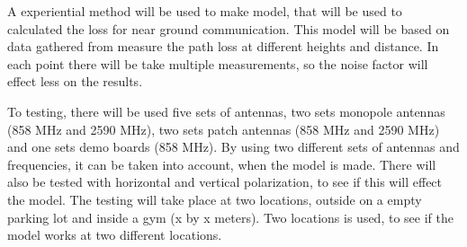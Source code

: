 A experiential method will be used to make model, that will be used to calculated the loss for near ground communication. This model will be based on data gathered from measure the path loss at different heights and distance. In each point there will be take multiple measurements, so the noise factor will effect less on the results.

To testing, there will be used five sets of antennas, two sets monopole antennas (858 MHz and 2590 MHz), two sets patch antennas (858 MHz and 2590 MHz) and one sets demo boards (858 MHz). By using two different sets of antennas and frequencies,  it can be taken into account, when the model is made. There will also be tested with horizontal and vertical polarization, to see if this will effect the model. The testing will take place at two locations, outside on a empty parking lot and inside a gym (x by x meters). Two locations is used, to see if the model works at two different locations.